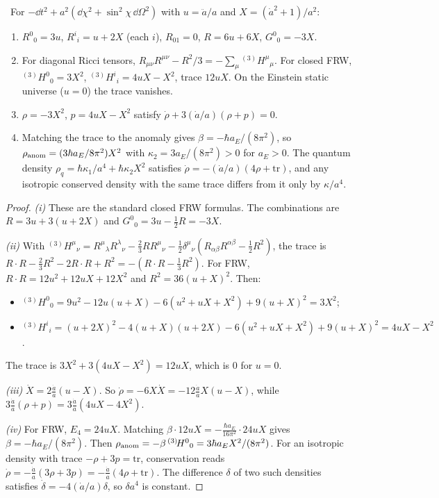 \begin{theorem}\label{thm:h3}\ver\
For $-\dd t^2+a^2(\dd\chi^2+\sin^2\chi\,\dd\Omega^2)$ with $u=\ddot a/a$ and $X=(\dot a^2+1)/a^2$:
\begin{enumerate}[label=(\roman*)]
\item $R^0{}_0=3u$, $R^i{}_i=u+2X$ (each $i$), $R_{01}=0$, $R=6u+6X$, $G^0{}_0=-3X$.
\item For diagonal Ricci tensors, $R_{\mu\nu}R^{\mu\nu}-R^2/3=-\sum_\mu{}^{(3)}\!H^\mu{}_\mu$. For closed FRW, ${}^{(3)}\!H^0{}_0=3X^2$, ${}^{(3)}\!H^i{}_i=4uX-X^2$, trace $12uX$. On the Einstein static universe ($u=0$) the trace vanishes.
\item $\rho=-3X^2$, $p=4uX-X^2$ satisfy $\dot\rho+3(\dot a/a)(\rho+p)=0$.
\item Matching the trace to the anomaly gives $\beta=-\hbar a_E/(8\pi^2)$, so $\rho_{\rm anom}=(3\hbar a_E/8\pi^2)X^2$ with $\kappa_2=3a_E/(8\pi^2)>0$ for $a_E>0$. The quantum density $\rho_q=\hbar\kappa_1/a^4+\hbar\kappa_2X^2$ satisfies $\dot\rho=-(\dot a/a)(4\rho+\mathrm{tr})$, and any isotropic conserved density with the same trace differs from it only by $\kappa/a^4$.
\end{enumerate}
\end{theorem}
\begin{proof}
\emph{(i)} These are the standard closed FRW formulas. The combinations are $R=3u+3(u+2X)$ and $G^0{}_0=3u-\frac12R=-3X$.

\emph{(ii)} With ${}^{(3)}\!H^\mu{}_\nu=R^\mu{}_\lambda R^\lambda{}_\nu-\frac23RR^\mu{}_\nu-\frac12\delta^\mu{}_\nu(R_{\alpha\beta}R^{\alpha\beta}-\frac12R^2)$, the trace is $R\cdot R-\frac23R^2-2R\cdot R+R^2=-(R\cdot R-\frac13R^2)$. For FRW, $R\cdot R=12u^2+12uX+12X^2$ and $R^2=36(u+X)^2$. Then:
\begin{itemize}[nosep]
\item ${}^{(3)}\!H^0{}_0=9u^2-12u(u+X)-6(u^2+uX+X^2)+9(u+X)^2=3X^2$;
\item ${}^{(3)}\!H^i{}_i=(u+2X)^2-4(u+X)(u+2X)-6(u^2+uX+X^2)+9(u+X)^2=4uX-X^2$.
\end{itemize}
The trace is $3X^2+3(4uX-X^2)=12uX$, which is $0$ for $u=0$.

\emph{(iii)} $\dot X=2\frac{\dot a}a(u-X)$. So $\dot\rho=-6X\dot X=-12\frac{\dot a}aX(u-X)$, while $3\frac{\dot a}a(\rho+p)=3\frac{\dot a}a(4uX-4X^2)$.

\emph{(iv)} For FRW, $E_4=24uX$. Matching $\beta\cdot12uX=-\frac{\hbar a_E}{16\pi^2}\cdot24uX$ gives $\beta=-\hbar a_E/(8\pi^2)$. Then $\rho_{\rm anom}=-\beta\,{}^{(3)}\!H^0{}_0=3\hbar a_EX^2/(8\pi^2)$. For an isotropic density with trace $-\rho+3p=\mathrm{tr}$, conservation reads $\dot\rho=-\frac{\dot a}a(3\rho+3p)=-\frac{\dot a}a(4\rho+\mathrm{tr})$. The difference $\delta$ of two such densities satisfies $\dot\delta=-4(\dot a/a)\delta$, so $\delta a^4$ is constant.
\end{proof}


